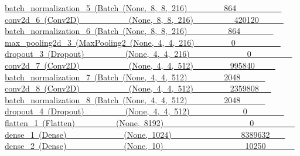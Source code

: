 \documentclass[twocolumn]{ujarticle}     %
\begin{document}
\underline{batch\_normalization\_5\ (Batch\ (None,\ 8,\ 8,\ 216)\ \ \ \ \ \ \ \ \ 864\ \ \ \ \ \ \ \ \ \ \ }
\\  
\underline{conv2d\_6\ (Conv2D)\ \ \ \ \ \ \ \ \ \ \ \ (None,\ 8,\ 8,\ 216)\ \ \ \ \ \ \ \ \ \ 420120\ \ \ \ \ \ }
\\  
\underline{batch\_normalization\_6\ (Batch\ (None,\ 8,\ 8,\ 216)\ \ \ \ \ \ \ \ \ \ 864\ \ \ \ \ \ \ \ }
\\  
\underline{max\_pooling2d\_3\ (MaxPooling2\ (None,\ 4,\ 4,\ 216)\ \ \ \ \ \ \ \ \ 0\ \ \ \ \ \ \ \ \ \ \ }
\\  
\underline{dropout\_3\ (Dropout)\ \ \ \ \ \ \ \ \ \ (None,\ 4,\ 4,\ 216)\ \ \ \ \ \ \ \ \ \ \  \ \ \ 0\ \ \ \ \ \ \ \ \ \ }
\\  
\underline{conv2d\_7\ (Conv2D)\ \ \ \ \ \ \ \ \ \ \ \ (None,\ 4,\ 4,\ 512)\ \ \ \ \ \ \ \ \ 995840\ \ \ \ \ }
\\  
\underline{batch\_normalization\_7\ (Batch\ (None,\ 4,\ 4,\ 512)\ \ \ \ \ \ \ \ \ 2048\ \ \ \ \ \ }
\\  
\underline{conv2d\_8\ (Conv2D)\ \ \ \ \ \ \ \ \ \ \ \ (None,\ 4,\ 4,\ 512)\ \ \ \ \ \ \ \ \ 2359808\ \ \ }
\\  
\underline{batch\_normalization\_8\ (Batch\ (None,\ 4,\ 4,\ 512)\ \ \ \ \ \ \ \ \ 2048\ \ \ \ \ \ }
\\  
\underline{dropout\_4\ (Dropout)\ \ \ \ \ \ \ \ \ \ (None,\ 4,\ 4,\ 512)\ \ \ \ \ \ \ \ \ \ \ \ \ 0\ \ \ \ \ \ \ \ \ }
\\  
\underline{flatten\_1\ (Flatten)\ \ \ \ \ \ \ \ \ \ (None,\ 8192)\ \ \ \ \ \ \ \ \ \ \ \ \ \ \ \ \ \ \ \ \ 0\ \ \ \ \ \ \ \ \ \ }
\\  
\underline{dense\_1\ (Dense)\ \ \ \ \ \ \ \ \ \ \ \ \ \ (None,\ 1024)\ \ \ \ \ \ \ \ \ \ \ \ \ \ \ \ \ 8389632 \ \ \ }
\\  
\underline{dense\_2\ (Dense)\ \ \ \ \ \ \ \ \ \ \ \ \ \ (None,\ 10)\ \ \ \ \ \ \ \ \ \ \ \ \ \ \ \ \ \ \ \ 10250\ \ \ \ \ \ \ }
\end{document}
